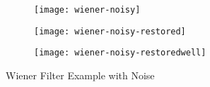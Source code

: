 \begin{figure}[ht]
	\centering
	\begin{subfigure}[b]{0.3\textwidth}
		\centering
		\texttt{[image: wiener-noisy]}
		\caption{}
		\label{fig:wiener-noisy}
	\end{subfigure}\hfill
	\begin{subfigure}[b]{0.3\textwidth}
		\centering
		\texttt{[image: wiener-noisy-restored]}
		\caption{}
		\label{fig:wiener-noisy-restored}
	\end{subfigure}\hfill
	\begin{subfigure}[b]{0.3\textwidth}
		\centering
		\texttt{[image: wiener-noisy-restoredwell]}
		\caption{}
		\label{fig:wiener-noisy-restoredwell}
	\end{subfigure}
	\caption{Wiener Filter Example with Noise}\label{fig:wienernoisy}
\end{figure}
